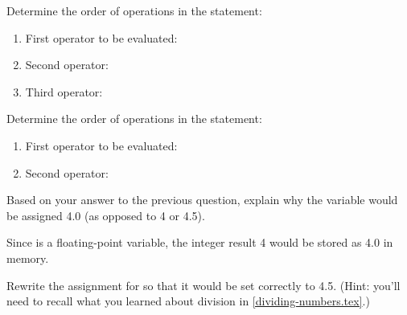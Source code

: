 \newpage

\Q Determine the order of operations in the statement: ~ 

\begin{enumerate}[itemsep=2pt]
\item First operator to be evaluated: \ans[3em]{\java{-}}
\item Second operator: \ans[3em]{\java{*}}
\item Third operator: \ans[3em]{\java{=}}
\end{enumerate}


\Q Determine the order of operations in the statement: ~ 

\begin{enumerate}[itemsep=2pt]
\item First operator to be evaluated: \ans[3em]{\java{/}}
\item Second operator: \ans[3em]{\java{=}}
\end{enumerate}


\Q Based on your answer to the previous question, explain why the variable  would be assigned 4.0 (as opposed to 4 or 4.5).

\begin{answer}
Since  is a floating-point variable, the integer result 4 would be stored as 4.0 in memory.
\end{answer}


\Q Rewrite the assignment for  so that it would be set correctly to 4.5. (Hint: you'll need to recall what you learned about division in \ref{dividing-numbers.tex}.)

\begin{answer}
\end{answer}
